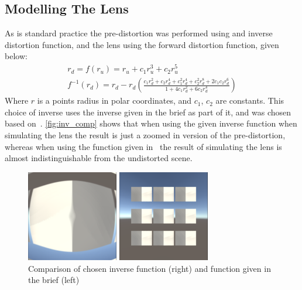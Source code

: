 \documentclass[]{article}
\begin{document}
\subsection{Modelling The Lens}
As is standard practice the pre-distortion was performed using and inverse distortion function, and the lens using the forward distortion function, given below:
\begin{gather*}
	r_d = f(r_u) = r_u + c_1r_u^3+c_2r_u^5 \\
	f^{-1}(r_d) = r_d - r_d\left(
	\frac{c_1r_d^2+c_2r_d^4+c_1^2r_d^4+c_2^2r_d^8+2c_1c_2r_d^6}{1+4c_1r_d^2+6c_2r_d^4}
	\right)
\end{gather*}
Where $r$ is a points radius in polar coordinates, and $c_1$, $c_2$ are constants. This choice of inverse uses the inverse given in the brief as part of it, and was chosen based on~\cite{inverse}. \autoref{fig:inv_comp} shows that when using the given inverse function when simulating the lens the result is just a zoomed in version of the pre-distortion, whereas when using the function given in~\cite{inverse} the result of simulating the lens is almost indistinguishable from the undistorted scene.
\begin{figure}[H]
	\centering
	\begin{minipage}[H]{0.2\textwidth}
		\includegraphics[width=4cm]{inv_fail}
	\end{minipage}
	\hspace{1cm}
	\begin{minipage}[H]{0.2\textwidth}
		\includegraphics[width=4cm]{inv_success}
	\end{minipage}
	\caption{Comparison of chosen inverse function (right) and function given in the brief (left)}
	\label{fig:inv_comp}
\end{figure}
\end{document}
